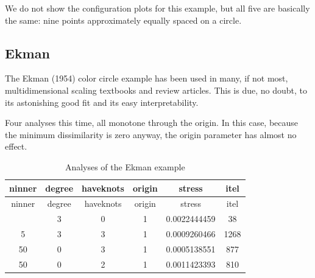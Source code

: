 \documentclass[
  12pt,
]{article}
\begin{document}
We do not show the configuration plots for this example, but all five are basically
the same: nine points approximately equally spaced on a circle.

\subsection{Ekman}\label{ekman}

The Ekman (1954) color circle example has been used in many, if not most, multidimensional scaling textbooks and review articles. This is due, no doubt,
to its astonishing good fit and its easy interpretability.

Four analyses this time, all monotone through the origin. In this case, because
the minimum dissimilarity is zero anyway, the origin parameter has almost no
effect.

\begin{longtable}[]{@{}cccccc@{}}
\caption{\label{tab:ekmankable}Analyses of the Ekman example}\tabularnewline
\toprule\noalign{}
ninner & degree & haveknots & origin & stress & itel \\
\midrule\noalign{}
\endfirsthead
\toprule\noalign{}
ninner & degree & haveknots & origin & stress & itel \\
\midrule\noalign{}
\endhead
\bottomrule\noalign{}
\endlastfoot
0 & 3 & 0 & 1 & 0.0022444459 & 38 \\
5 & 3 & 3 & 1 & 0.0009260466 & 1268 \\
50 & 0 & 3 & 1 & 0.0005138551 & 877 \\
50 & 0 & 2 & 1 & 0.0011423393 & 810 \\
\end{longtable}
\end{document}
